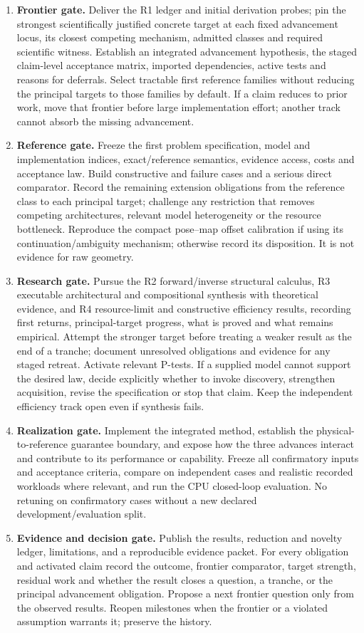 \documentclass[11pt,letterpaper]{article}
\begin{document}
\begin{enumerate}
\item \textbf{Frontier gate.} Deliver the R1 ledger and initial derivation probes; pin the strongest scientifically justified concrete target at each fixed advancement locus, its closest competing mechanism, admitted classes and required scientific witness. Establish an integrated advancement hypothesis, the staged claim-level acceptance matrix, imported dependencies, active tests and reasons for deferrals. Select tractable first reference families without reducing the principal targets to those families by default. If a claim reduces to prior work, move that frontier before large implementation effort; another track cannot absorb the missing advancement.
\item \textbf{Reference gate.} Freeze the first problem specification, model and implementation indices, exact/reference semantics, evidence access, costs and acceptance law. Build constructive and failure cases and a serious direct comparator. Record the remaining extension obligations from the reference class to each principal target; challenge any restriction that removes competing architectures, relevant model heterogeneity or the resource bottleneck. Reproduce the compact pose--map offset calibration if using its continuation/ambiguity mechanism; otherwise record its disposition. It is not evidence for raw geometry.
\item \textbf{Research gate.} Pursue the R2 forward/inverse structural calculus, R3 executable architectural and compositional synthesis with theoretical evidence, and R4 resource-limit and constructive efficiency results, recording first returns, principal-target progress, what is proved and what remains empirical. Attempt the stronger target before treating a weaker result as the end of a tranche; document unresolved obligations and evidence for any staged retreat. Activate relevant P-tests. If a supplied model cannot support the desired law, decide explicitly whether to invoke discovery, strengthen acquisition, revise the specification or stop that claim. Keep the independent efficiency track open even if synthesis fails.
\item \textbf{Realization gate.} Implement the integrated method, establish the physical-to-reference guarantee boundary, and expose how the three advances interact and contribute to its performance or capability. Freeze all confirmatory inputs and acceptance criteria, compare on independent cases and realistic recorded workloads where relevant, and run the CPU closed-loop evaluation. No retuning on confirmatory cases without a new declared development/evaluation split.
\item \textbf{Evidence and decision gate.} Publish the results, reduction and novelty ledger, limitations, and a reproducible evidence packet. For every obligation and activated claim record the outcome, frontier comparator, target strength, residual work and whether the result closes a question, a tranche, or the principal advancement obligation. Propose a next frontier question only from the observed results. Reopen milestones when the frontier or a violated assumption warrants it; preserve the history.
\end{enumerate}
\end{document}
